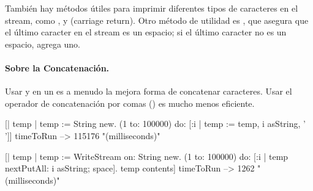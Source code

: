 \documentclass[a4paper,10pt,twoside]{book}
\begin{document}
{%
Tambi\'en hay m\'etodos \'utiles para imprimir diferentes tipos de caracteres en el stream, 
como ,  y  (carriage return).
Otro m\'etodo de utilidad es , que asegura que el \'ultimo caracter
en el stream es un espacio; si el \'ultimo caracter no es un espacio, agrega uno. 

\paragraph{Sobre la Concatenaci\'on.}
Usar  y  en un  es a menudo la mejora forma de concatenar caracteres. Usar el operador de concatenaci\'on por comas (\ct{,}) es mucho menos eficiente. 

\begin{code}{}
[| temp |
  temp := String new.
  (1 to: 100000)
    do: [:i | temp := temp, i asString, ' ']] timeToRun --> 115176 "(milliseconds)"

[| temp |
  temp := WriteStream on: String new.
  (1 to: 100000)
    do: [:i | temp nextPutAll: i asString; space].
  temp contents] timeToRun --> 1262 "(milliseconds)"
\end{code}

}
\end{document}
